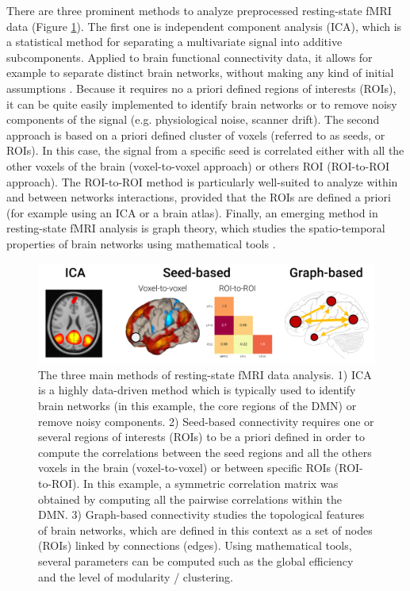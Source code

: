 There are three prominent methods to analyze preprocessed resting-state fMRI data (Figure \ref{fig:methods:ana-methods}). The first one is independent component analysis (ICA), which is a statistical method for separating a multivariate signal into additive subcomponents. Applied to brain functional connectivity data, it allows for example to separate distinct brain networks, without making any kind of initial assumptions \citep{beckmann_investigations_2005}. Because it requires no a priori defined regions of interests (ROIs), it can be quite easily implemented to identify brain networks or to remove noisy components of the signal (e.g. physiological noise, scanner drift). The second approach is based on a priori defined cluster of voxels (referred to as seeds, or ROIs). In this case, the signal from a specific seed is correlated either with all the other voxels of the brain (voxel-to-voxel approach) or others ROI (ROI-to-ROI approach). The ROI-to-ROI method is particularly well-suited to analyze within and between networks interactions, provided that the ROIs are defined a priori (for example using an ICA or a brain atlas). Finally, an emerging method in resting-state fMRI analysis is graph theory, which studies the spatio-temporal properties of brain networks using mathematical tools \citep{bullmore_complex_2009}.

\begin{figure}[htb]
	\includegraphics[width=\textwidth]{Fig/Methods/fMRI_seed_graph_ica/fMRI_seed_graph_ica.png}
	\caption[The three main methods of resting-state fMRI data analysis]{The three main methods of resting-state fMRI data analysis. 1) ICA is a highly data-driven method which is typically used to identify brain networks (in this example, the core regions of the DMN) or remove noisy components. 2) Seed-based connectivity requires one or several regions of interests (ROIs) to be a priori defined in order to compute the correlations between the seed regions and all the others voxels in the brain (voxel-to-voxel) or between specific ROIs (ROI-to-ROI). In this example, a symmetric correlation matrix was obtained by computing all the pairwise correlations within the DMN. 3) Graph-based connectivity studies the topological features of brain networks, which are defined in this context as a set of nodes (ROIs) linked by connections (edges). Using mathematical tools, several parameters can be computed such as the global efficiency and the level of modularity / clustering.}
	\label{fig:methods:ana-methods}
\end{figure}


